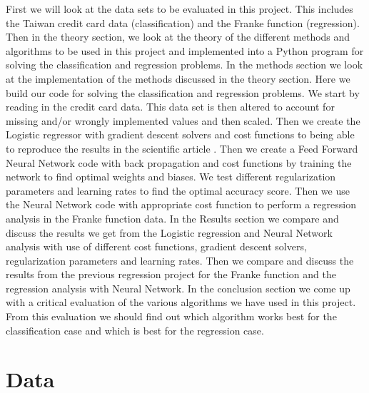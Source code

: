 \documentclass[12pt,a4paper,english]{article}
\begin{document}
First we will look at the data sets to be evaluated in this project. This includes the Taiwan credit card data (classification) and the Franke function (regression). Then in the theory section, we look at the theory of the different methods and algorithms to be used in this project and implemented into a Python program for solving the classification and regression problems. In the methods section we look at the implementation of the methods discussed in the theory section. Here we build our code for solving the classification and regression problems. We start by reading in the credit card data. This data set is then altered to account for missing and/or wrongly implemented values and then scaled. Then we create the Logistic regressor with gradient descent solvers and cost functions to being able to reproduce the results in the scientific article \cite{origarticle}. Then we create a Feed Forward Neural Network code with back propagation and cost functions by training the network to find optimal weights and biases. We test different regularization parameters and learning rates to find the optimal accuracy score. Then we use the Neural Network code with appropriate cost function to perform a regression analysis in the Franke function data. In the Results section we compare and discuss the results we get from the Logistic regression and Neural Network analysis with use of different cost functions, gradient descent solvers, regularization parameters  and learning rates. Then we compare and discuss the results from the previous regression project for the Franke function and the regression analysis with Neural Network. In the conclusion section we come up with a critical evaluation of the various algorithms we have used in this project. From this evaluation we should find out which algorithm works best for the classification case and which is best for the regression case.

\section{Data}
\end{document}
